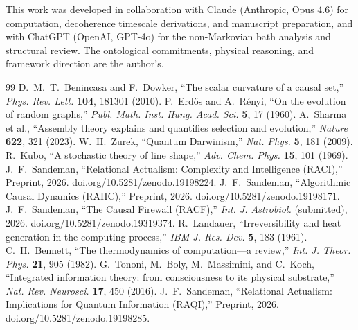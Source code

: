 \documentclass[11pt]{article}
\begin{document}
This work was developed in collaboration with Claude (Anthropic, Opus 4.6) for computation, decoherence timescale derivations, and manuscript preparation, and with ChatGPT (OpenAI, GPT-4o) for the non-Markovian bath analysis and structural review. The ontological commitments, physical reasoning, and framework direction are the author's.

\begin{thebibliography}{99}
 D.~M.~T.~Benincasa and F.~Dowker, ``The scalar curvature of a causal set,'' \emph{Phys. Rev. Lett.} \textbf{104}, 181301 (2010).
 P.~Erd\H{o}s and A.~R\'enyi, ``On the evolution of random graphs,'' \emph{Publ. Math. Inst. Hung. Acad. Sci.} \textbf{5}, 17 (1960).
 A.~Sharma et al., ``Assembly theory explains and quantifies selection and evolution,'' \emph{Nature} \textbf{622}, 321 (2023).
 W.~H.~Zurek, ``Quantum Darwinism,'' \emph{Nat. Phys.} \textbf{5}, 181 (2009).
 R.~Kubo, ``A stochastic theory of line shape,'' \emph{Adv. Chem. Phys.} \textbf{15}, 101 (1969).
 J.~F.~Sandeman, ``Relational Actualism: Complexity and Intelligence (RACI),'' Preprint, 2026. doi.org/10.5281/zenodo.19198224.
 J.~F.~Sandeman, ``Algorithmic Causal Dynamics (RAHC),'' Preprint, 2026. doi.org/10.5281/zenodo.19198171.
 J.~F.~Sandeman, ``The Causal Firewall (RACF),'' \emph{Int. J. Astrobiol.} (submitted), 2026. doi.org/10.5281/zenodo.19319374.
 R.~Landauer, ``Irreversibility and heat generation in the computing process,'' \emph{IBM J. Res. Dev.} \textbf{5}, 183 (1961).
 C.~H.~Bennett, ``The thermodynamics of computation---a review,'' \emph{Int. J. Theor. Phys.} \textbf{21}, 905 (1982).
 G.~Tononi, M.~Boly, M.~Massimini, and C.~Koch, ``Integrated information theory: from consciousness to its physical substrate,'' \emph{Nat. Rev. Neurosci.} \textbf{17}, 450 (2016).
 J.~F.~Sandeman, ``Relational Actualism: Implications for Quantum Information (RAQI),'' Preprint, 2026. doi.org/10.5281/zenodo.19198285.
\end{thebibliography}
\end{document}
